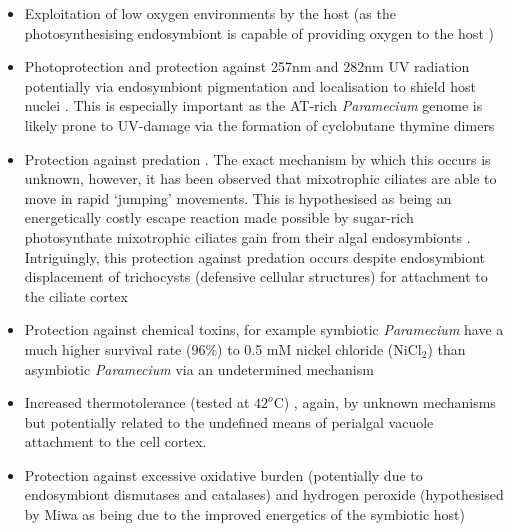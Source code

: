 \begin{itemize}
    \item Exploitation of low oxygen environments by the host (as the photosynthesising endosymbiont is capable of providing oxygen to the host \citep{Reisser1980})
\item Photoprotection and protection against 257nm and 282nm UV radiation potentially via endosymbiont pigmentation and localisation to shield host nuclei \citep{Sommaruga2009,Summerer2009,Miwa2009}.  
    This is especially important as the AT-rich \textit{Paramecium} genome is likely prone to UV-damage via the formation of cyclobutane thymine dimers \citep{Sommaruga,2009}
\item Protection against predation \citep{Berger1980}. 
    The exact mechanism by which this occurs is unknown, however, it has been observed that mixotrophic ciliates are able to move in rapid `jumping' movements. 
    This is hypothesised as being an energetically costly escape reaction made possible by sugar-rich photosynthate mixotrophic ciliates gain from their algal endosymbionts \citep{Perez1997}. 
    Intriguingly, this protection against predation occurs despite endosymbiont displacement of trichocysts (defensive cellular structures) for attachment to the ciliate cortex \citep{Kodama2011}
\item Protection against chemical toxins, for example symbiotic \textit{Paramecium} have a much higher survival rate (96\%) to 0.5 mM nickel chloride (NiCl$_{2}$) than asymbiotic \textit{Paramecium} via an undetermined mechanism \citep{Miwa2009}
\item Increased thermotolerance (tested at $42^{o}$C) \citep{Miwa2009}, again, by unknown mechanisms but potentially related to the undefined means of perialgal vacuole attachment to the cell cortex.
\item Protection against excessive oxidative burden (potentially due to endosymbiont dismutases and catalases) \citep{Hortnagl2007} and hydrogen peroxide (hypothesised by Miwa as being due to the improved energetics of the symbiotic host) \citep{Miwa2009}
\end{itemize}

